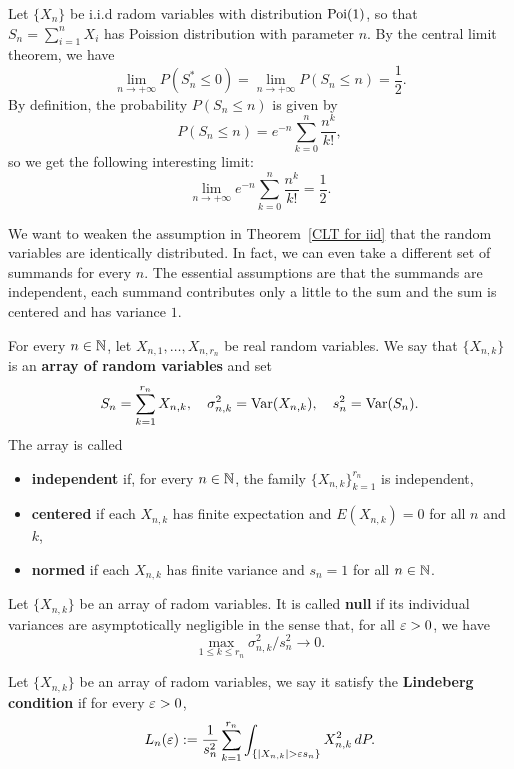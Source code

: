 \begin{example}
Let $\{X_n\}$ be i.i.d radom variables with distribution $\mathrm{Poi}(1)$, so that $S_n=\sum_{i=1}^{n}X_i$ has Poission distribution with parameter $n$. By the central limit theorem, we have
\[\lim_{n\to+\infty}P(S_n^*\leq 0)=\lim_{n\to+\infty}P(S_n\leq n)=\frac{1}{2}.\]
By definition, the probability $P(S_n\leq n)$ is given by
\[P(S_n\leq n)=e^{-n}\sum_{k=0}^{n}\frac{n^k}{k!},\]
so we get the following interesting limit:
\[\lim_{n\to+\infty}e^{-n}\sum_{k=0}^{n}\frac{n^k}{k!}=\frac{1}{2}.\]
\end{example}
We want to weaken the assumption in Theorem~\ref{CLT for iid} that the random variables are identically distributed. In fact, we can even take a different set of summands for every $n$. The essential assumptions are that the summands are independent, each summand contributes only a little to the sum and the sum is centered and has variance $1$.
\begin{definition}
For every $n\in\mathbb{N}$, let $X_{n,1},\dots,X_{n,r_n}$ be real random variables. We say that $\{X_{n,k}\}$ is an \textbf{array of random variables} and set
\[S_n=\sum_{k=1}^{r_n}X_{n,k},\quad\sigma_{n,k}^2=\mathrm{Var}(X_{n,k}),\quad s_n^2=\mathrm{Var}(S_n).\]
The array is called
\begin{itemize}
\item \textbf{independent} if, for every $n\in\mathbb{N}$, the family $\{X_{n,k}\}_{k=1}^{r_n}$ is independent,
\item \textbf{centered} if each $X_{n,k}$ has finite expectation and $E(X_{n,k})=0$ for all $n$ and $k$,
\item \textbf{normed} if each $X_{n,k}$ has finite variance and $s_n=1$ for all $n\in\mathbb{N}$.
\end{itemize}
\end{definition}
\begin{definition}
Let $\{X_{n,k}\}$ be an array of radom variables. It is called \textbf{null} if its individual variances are asymptotically negligible in the sense that, for all $\varepsilon>0$, we have
\[\max_{1\leq k\leq r_n}\sigma^2_{n,k}/s_n^2\to 0.\]
\end{definition}
\begin{definition}
Let $\{X_{n,k}\}$ be an array of radom variables, we say it satisfy the \textbf{Lindeberg condition} if for every $\varepsilon>0$,
\begin{align}\label{Lindeberg condition}
L_n(\eps):=\frac{1}{s_n^2}\sum_{k=1}^{r_n}\int_{\{|X_{n,k}|>\eps s_n\}}X_{n,k}^2\,dP.
\end{align}
\end{definition}
